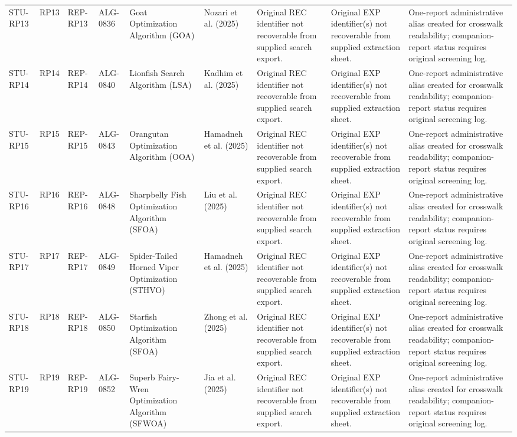 \documentclass[9pt]{article}
\begin{document}
\begin{landscape}
\begin{longtable}{P{1.5cm}P{1.0cm}P{1.8cm}P{1.8cm}P{5.2cm}P{4.3cm}P{3.4cm}P{3.3cm}P{3.0cm}}
STU-RP13 & RP13 & REP-RP13 & ALG-0836 & Goat Optimization Algorithm (GOA) & Nozari et al. (2025) & Original REC identifier not recoverable from supplied search export. & Original EXP identifier(s) not recoverable from supplied extraction sheet. & One-report administrative alias created for crosswalk readability; companion-report status requires original screening log. \\
STU-RP14 & RP14 & REP-RP14 & ALG-0840 & Lionfish Search Algorithm (LSA) & Kadhim et al. (2025) & Original REC identifier not recoverable from supplied search export. & Original EXP identifier(s) not recoverable from supplied extraction sheet. & One-report administrative alias created for crosswalk readability; companion-report status requires original screening log. \\
STU-RP15 & RP15 & REP-RP15 & ALG-0843 & Orangutan Optimization Algorithm (OOA) & Hamadneh et al. (2025) & Original REC identifier not recoverable from supplied search export. & Original EXP identifier(s) not recoverable from supplied extraction sheet. & One-report administrative alias created for crosswalk readability; companion-report status requires original screening log. \\
STU-RP16 & RP16 & REP-RP16 & ALG-0848 & Sharpbelly Fish Optimization Algorithm (SFOA) & Liu et al. (2025) & Original REC identifier not recoverable from supplied search export. & Original EXP identifier(s) not recoverable from supplied extraction sheet. & One-report administrative alias created for crosswalk readability; companion-report status requires original screening log. \\
STU-RP17 & RP17 & REP-RP17 & ALG-0849 & Spider-Tailed Horned Viper Optimization (STHVO) & Hamadneh et al. (2025) & Original REC identifier not recoverable from supplied search export. & Original EXP identifier(s) not recoverable from supplied extraction sheet. & One-report administrative alias created for crosswalk readability; companion-report status requires original screening log. \\
STU-RP18 & RP18 & REP-RP18 & ALG-0850 & Starfish Optimization Algorithm (SFOA) & Zhong et al. (2025) & Original REC identifier not recoverable from supplied search export. & Original EXP identifier(s) not recoverable from supplied extraction sheet. & One-report administrative alias created for crosswalk readability; companion-report status requires original screening log. \\
STU-RP19 & RP19 & REP-RP19 & ALG-0852 & Superb Fairy-Wren Optimization Algorithm (SFWOA) & Jia et al. (2025) & Original REC identifier not recoverable from supplied search export. & Original EXP identifier(s) not recoverable from supplied extraction sheet. & One-report administrative alias created for crosswalk readability; companion-report status requires original screening log. \\

\end{longtable}
\end{landscape}
\end{document}
